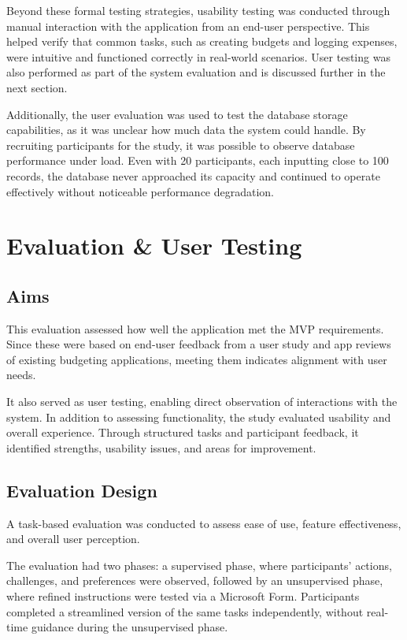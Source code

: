 \documentclass{l4proj}
\begin{document}
Beyond these formal testing strategies, usability testing was conducted through manual interaction with the application from an end-user perspective. This helped verify that common tasks, such as creating budgets and logging expenses, were intuitive and functioned correctly in real-world scenarios. User testing was also performed as part of the system evaluation and is discussed further in the next section.

Additionally, the user evaluation was used to test the database storage capabilities, as it was unclear how much data the system could handle. By recruiting participants for the study, it was possible to observe database performance under load. Even with 20 participants, each inputting close to 100 records, the database never approached its capacity and continued to operate effectively without noticeable performance degradation.

\section{Evaluation \& User Testing}
\subsection{Aims}
This evaluation assessed how well the application met the MVP requirements. Since these were based on end-user feedback from a user study and app reviews of existing budgeting applications, meeting them indicates alignment with user needs.

It also served as user testing, enabling direct observation of interactions with the system. In addition to assessing functionality, the study evaluated usability and overall experience. Through structured tasks and participant feedback, it identified strengths, usability issues, and areas for improvement.

\subsection{Evaluation Design}
A task-based evaluation was conducted to assess ease of use, feature effectiveness, and overall user perception. 

The evaluation had two phases: a supervised phase, where participants’ actions, challenges, and preferences were observed, followed by an unsupervised phase, where refined instructions were tested via a Microsoft Form. Participants completed a streamlined version of the same tasks independently, without real-time guidance during the unsupervised phase.
\end{document}
